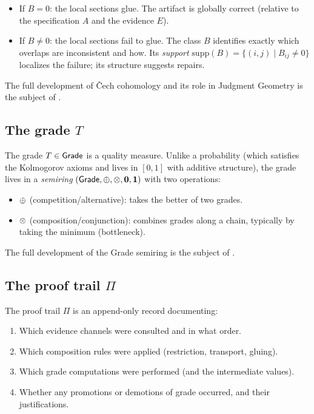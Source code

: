 \begin{itemize}
\item If $B = 0$: the local sections glue.  The artifact is globally
  correct (relative to the specification $A$ and the evidence $E$).

\item If $B \neq 0$: the local sections fail to glue.  The class $B$
  identifies exactly which overlaps are inconsistent and how.  Its
  \emph{support} $\mathrm{supp}(B) = \{(i, j) \mid B_{ij} \neq 0\}$
  localizes the failure; its structure suggests repairs.
\end{itemize}

The full development of \v{C}ech cohomology and its role in Judgment
Geometry is the subject of .

\subsection{The grade \texorpdfstring{$T$}{T}}
\label{sec:judgment:grade}

The grade $T \in \mathsf{Grade}$ is a quality measure.  Unlike a probability
(which satisfies the Kolmogorov axioms and lives in $[0, 1]$ with
additive structure), the grade lives in a \emph{semiring}
$(\mathsf{Grade}, \oplus, \otimes, \mathbf{0}, \mathbf{1})$ with two operations:

\begin{itemize}
\item $\oplus$ (competition/alternative): takes the better of two grades.
\item $\otimes$ (composition/conjunction): combines grades along a chain,
  typically by taking the minimum (bottleneck).
\end{itemize}

The full development of the Grade semiring is the subject of
.

\subsection{The proof trail \texorpdfstring{$\Pi$}{Π}}
\label{sec:judgment:trail}

The proof trail $\Pi$ is an append-only record documenting:
\begin{enumerate}[nosep]
\item Which evidence channels were consulted and in what order.
\item Which composition rules were applied (restriction, transport,
  gluing).
\item Which grade computations were performed (and the intermediate
  values).
\item Whether any promotions or demotions of grade occurred, and their
  justifications.
\end{enumerate}

